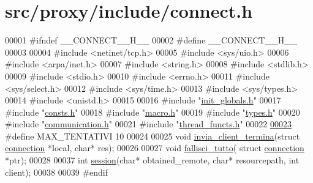 \hypertarget{connect_8h_source}{
\section{src/proxy/include/connect.h}
}

\begin{DoxyCode}
00001 \textcolor{preprocessor}{#ifndef \_\_CONNECT\_\_H\_\_}
00002 \textcolor{preprocessor}{}\textcolor{preprocessor}{#define \_\_CONNECT\_\_H\_\_}
00003 \textcolor{preprocessor}{}
00004 \textcolor{preprocessor}{#include <netinet/tcp.h>}
00005 \textcolor{preprocessor}{#include <sys/uio.h>}
00006 \textcolor{preprocessor}{#include <arpa/inet.h>}
00007 \textcolor{preprocessor}{#include <string.h>}
00008 \textcolor{preprocessor}{#include <stdlib.h>}
00009 \textcolor{preprocessor}{#include <stdio.h>}
00010 \textcolor{preprocessor}{#include <errno.h>}
00011 \textcolor{preprocessor}{#include <sys/select.h>}
00012 \textcolor{preprocessor}{#include <sys/time.h>}
00013 \textcolor{preprocessor}{#include <sys/types.h>}
00014 \textcolor{preprocessor}{#include <unistd.h>}
00015 
00016 \textcolor{preprocessor}{#include "\hyperlink{init__globals_8h}{init_globals.h}"}
00017 \textcolor{preprocessor}{#include "\hyperlink{proxy_2include_2consts_8h}{consts.h}"}
00018 \textcolor{preprocessor}{#include "\hyperlink{macro_8h}{macro.h}"}
00019 \textcolor{preprocessor}{#include "\hyperlink{types_8h}{types.h}"}
00020 \textcolor{preprocessor}{#include "\hyperlink{communication_8h}{communication.h}"}
00021 \textcolor{preprocessor}{#include "\hyperlink{thread__functs_8h}{thread_functs.h}"}
00022 
\hypertarget{connect_8h_source_l00023}{}\hyperlink{connect_8h_a1810a697ffea7e0c6fa75a04975bf592}{00023} \textcolor{preprocessor}{#define MAX\_TENTATIVI 10}
00024 \textcolor{preprocessor}{}
00025 \textcolor{keywordtype}{void} \hyperlink{connect_8c_a3f4566cd203c4eee3462788024e92ace}{invia_client_termina}(\textcolor{keyword}{struct} \hyperlink{structconnection}{connection} *local, \textcolor{keywordtype}{char}* res);
00026 
00027 \textcolor{keywordtype}{void}  \hyperlink{connect_8c_a18f58a0c2eaf27d94f052b0d1da20ff9}{fallisci_tutto}( \textcolor{keyword}{struct} \hyperlink{structconnection}{connection} *ptr);
00028 
00037 \textcolor{keywordtype}{int} \hyperlink{connect_8c_a71bcb65831f8c8fae42279514515fa41}{session}(\textcolor{keywordtype}{char}* obtained\_remote, \textcolor{keywordtype}{char}* resourcepath, \textcolor{keywordtype}{int} client);
00038 
00039 \textcolor{preprocessor}{#endif}
\end{DoxyCode}
